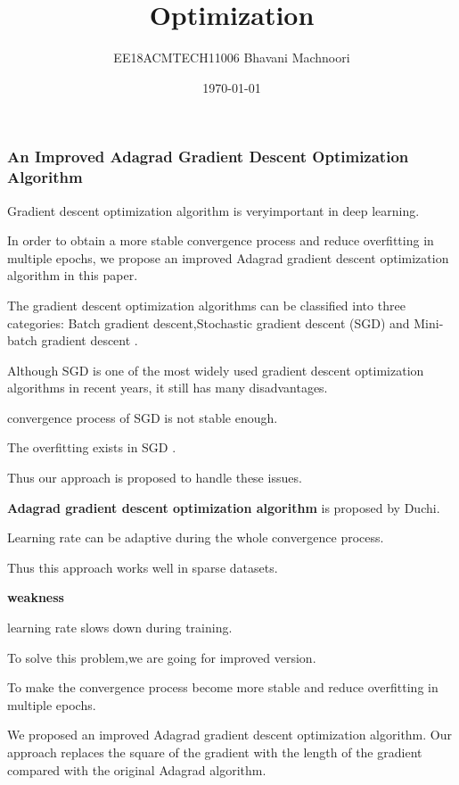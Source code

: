 \documentclass{beamer}
\title{Optimization}
\author{EE18ACMTECH11006     
        Bhavani Machnoori}
\date{\today}
\begin{document}
\begin{frame}
\titlepage
\end{frame}
\begin{frame}
\frametitle{An Improved Adagrad Gradient Descent Optimization Algorithm}
   Gradient descent optimization algorithm is veryimportant in deep learning. 
   
   
In order to obtain a more stable convergence process and reduce overfitting in multiple epochs, we propose an improved Adagrad gradient descent optimization algorithm in this paper. 
    \bigskip
   
\end{frame}
\begin{frame}
The gradient descent optimization algorithms can be classified into three categories: Batch gradient descent,Stochastic gradient descent (SGD) and Mini-batch gradient
descent . 

Although SGD is one of the most widely used gradient descent optimization algorithms in recent years, it still has many disadvantages. 


 convergence process of SGD is not stable enough.


 The overfitting exists in SGD  . 
 
 Thus our approach is proposed to handle these issues.

\end{frame}
\begin{frame}

\textbf{Adagrad gradient descent optimization algorithm} is proposed by Duchi.


Learning rate can be adaptive during the whole convergence process. 


Thus this approach works well in sparse datasets.
 
 
 \textbf{weakness }
 
learning rate slows down during training.

 To solve this problem,we are going for improved version.
\end{frame}
\begin{frame}
To make the convergence process become more stable and reduce overfitting in multiple epochs. 


We proposed an improved Adagrad gradient descent optimization algorithm.
Our approach replaces the square of the gradient with the length of the gradient compared with the original Adagrad algorithm. 


\end{frame}
\end{document}
